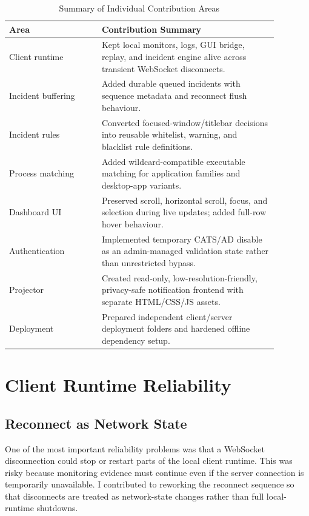 \documentclass[conference]{IEEEtran}
\begin{document}
\begin{table}[htbp]
\caption{Summary of Individual Contribution Areas}
\centering
\begin{tabular}{P{0.30\linewidth} P{0.58\linewidth}}
\toprule
\textbf{Area} & \textbf{Contribution Summary} \\
\midrule
Client runtime & Kept local monitors, logs, GUI bridge, replay, and incident engine alive across transient WebSocket disconnects. \\
Incident buffering & Added durable queued incidents with sequence metadata and reconnect flush behaviour. \\
Incident rules & Converted focused-window/titlebar decisions into reusable whitelist, warning, and blacklist rule definitions. \\
Process matching & Added wildcard-compatible executable matching for application families and desktop-app variants. \\
Dashboard UI & Preserved scroll, horizontal scroll, focus, and selection during live updates; added full-row hover behaviour. \\
Authentication & Implemented temporary CATS/AD disable as an admin-managed validation state rather than unrestricted bypass. \\
Projector & Created read-only, low-resolution-friendly, privacy-safe notification frontend with separate HTML/CSS/JS assets. \\
Deployment & Prepared independent client/server deployment folders and hardened offline dependency setup. \\
\bottomrule
\end{tabular}
\label{tab:summary}
\end{table}

\section{Client Runtime Reliability}

\subsection{Reconnect as Network State}

One of the most important reliability problems was that a WebSocket disconnection could stop or restart parts of the local client runtime. This was risky because monitoring evidence must continue even if the server connection is temporarily unavailable. I contributed to reworking the reconnect sequence so that disconnects are treated as network-state changes rather than full local-runtime shutdowns.
\end{document}
